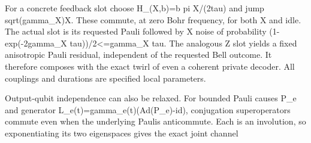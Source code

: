 \documentclass[
]{article}
\begin{document}
For a concrete feedback slot choose H\_(X,b)=b pi X/(2tau) and jump
s\allowbreak{}q\allowbreak{}r\allowbreak{}t\allowbreak{}(\allowbreak{}g\allowbreak{}a\allowbreak{}m\allowbreak{}m\allowbreak{}a\allowbreak{}\_\allowbreak{}X\allowbreak{})\allowbreak{}X\allowbreak{}.
These commute, at zero Bohr frequency, for both X and idle. The actual
slot is its requested Pauli followed by X noise of probability
(\allowbreak{}1\allowbreak{}-\allowbreak{}e\allowbreak{}x\allowbreak{}p\allowbreak{}(\allowbreak{}-\allowbreak{}2\allowbreak{}g\allowbreak{}a\allowbreak{}m\allowbreak{}m\allowbreak{}a\allowbreak{}\_\allowbreak{}X
t\allowbreak{}a\allowbreak{}u\allowbreak{})\allowbreak{})\allowbreak{}/\allowbreak{}2\allowbreak{}<\allowbreak{}=\allowbreak{}g\allowbreak{}a\allowbreak{}m\allowbreak{}m\allowbreak{}a\allowbreak{}\_\allowbreak{}X
tau. The analogous Z slot yields a fixed anisotropic Pauli residual,
independent of the requested Bell outcome. It therefore composes with
the exact twirl of even a coherent private decoder. All couplings and
durations are specified local parameters.

Output-qubit independence can also be relaxed. For bounded Pauli causes
P\_e and generator
L\allowbreak{}\_\allowbreak{}e\allowbreak{}(\allowbreak{}t\allowbreak{})\allowbreak{}=\allowbreak{}g\allowbreak{}a\allowbreak{}m\allowbreak{}m\allowbreak{}a\allowbreak{}\_\allowbreak{}e\allowbreak{}(\allowbreak{}t\allowbreak{})\allowbreak{}(\allowbreak{}A\allowbreak{}d\allowbreak{}(\allowbreak{}P\allowbreak{}\_\allowbreak{}e\allowbreak{})\allowbreak{}-\allowbreak{}i\allowbreak{}d\allowbreak{})\allowbreak{},
conjugation superoperators commute even when the underlying Paulis
anticommute. Each is an involution, so exponentiating its two
eigenspaces gives the exact joint channel
\end{document}
